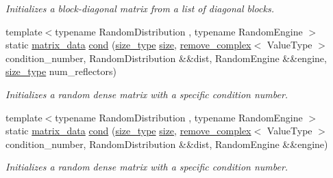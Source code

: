 \begin{DoxyCompactItemize}
\begin{DoxyCompactList}\small\item\em Initializes a block-\/diagonal matrix from a list of diagonal blocks. \end{DoxyCompactList}\item 
{\footnotesize template$<$typename Random\+Distribution , typename Random\+Engine $>$ }\\static \hyperlink{structgko_1_1matrix__data}{matrix\+\_\+data} \hyperlink{structgko_1_1matrix__data_a84056e4ef41884be328ec78554074df1}{cond} (\hyperlink{namespacegko_a6e5c95df0ae4e47aab2f604a22d98ee7}{size\+\_\+type} \hyperlink{structgko_1_1matrix__data_a30716bd9e39a7beed52fc56d737fc07b}{size}, \hyperlink{namespacegko_adfcb75c44f6b6c701989419c166f6e7e}{remove\+\_\+complex}$<$ Value\+Type $>$ condition\+\_\+number, Random\+Distribution \&\&dist, Random\+Engine \&\&engine, \hyperlink{namespacegko_a6e5c95df0ae4e47aab2f604a22d98ee7}{size\+\_\+type} num\+\_\+reflectors)
\begin{DoxyCompactList}\small\item\em Initializes a random dense matrix with a specific condition number. \end{DoxyCompactList}\item 
{\footnotesize template$<$typename Random\+Distribution , typename Random\+Engine $>$ }\\static \hyperlink{structgko_1_1matrix__data}{matrix\+\_\+data} \hyperlink{structgko_1_1matrix__data_aff5d2293d78e83ed783b5b8e231e7ede}{cond} (\hyperlink{namespacegko_a6e5c95df0ae4e47aab2f604a22d98ee7}{size\+\_\+type} \hyperlink{structgko_1_1matrix__data_a30716bd9e39a7beed52fc56d737fc07b}{size}, \hyperlink{namespacegko_adfcb75c44f6b6c701989419c166f6e7e}{remove\+\_\+complex}$<$ Value\+Type $>$ condition\+\_\+number, Random\+Distribution \&\&dist, Random\+Engine \&\&engine)
\begin{DoxyCompactList}\small\item\em Initializes a random dense matrix with a specific condition number. \end{DoxyCompactList}\end{DoxyCompactItemize}
